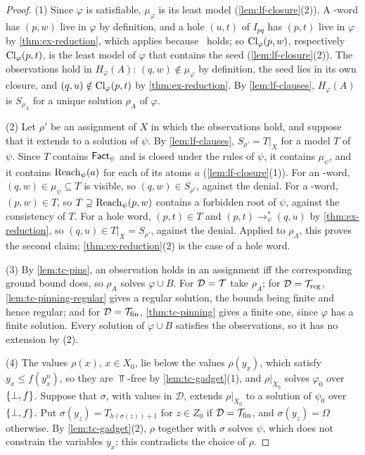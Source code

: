 \begin{proof}
(1) Since $\varphi$ is satisfiable, $\mu_\varphi$ is its least model
(\cref{lem:lf-closure}(2)). A \CondU-word has $(p,w)$ live in $\varphi$ by
definition, and a hole $(u,t)$ of $I_{pq}$ has $(p,t)$ live in $\varphi$ by
\cref{thm:ex-reduction}, which applies because \CondU\ holds; so
$\operatorname{Cl}_\varphi(p,w)$, respectively $\operatorname{Cl}_\varphi(p,t)$, is the least model of
$\varphi$ that contains the seed (\cref{lem:lf-closure}(2)). The observations
hold in $H_\varphi(A)$: $(q,w)\notin\mu_\varphi$ by definition, the seed lies
in its own closure, and $(q,u)\notin\operatorname{Cl}_\varphi(p,t)$ by
\cref{thm:ex-reduction}. By \cref{lem:lf-clauses}, $H_\varphi(A)$ is
$S_{\rho_A}$ for a unique solution $\rho_A$ of $\varphi$.

(2) Let $\rho'$ be an assignment of $X$ in which the observations hold, and
suppose that it extends to a solution of $\psi$. By \cref{lem:lf-clauses},
$S_{\rho'}=T|_X$ for a model $T$ of $\psi$. Since $T$ contains $\mathsf{Fact}_\psi$
and is closed under the rules of $\psi$, it contains $\mu_\psi$, and it
contains $\operatorname{Reach}_\psi(a)$ for each of its atoms $a$ (\cref{lem:lf-closure}(1)).
For an \CondI-word, $(q,w)\in\mu_\psi\subseteq T$ is visible, so
$(q,w)\in S_{\rho'}$, against the denial. For a \CondU-word, $(p,w)\in T$, so
$T\supseteq\operatorname{Reach}_\psi(p,w)$ contains a forbidden root of $\psi$, against the
consistency of $T$. For a hole word, $(p,t)\in T$ and
$(p,t)\to^*_\psi(q,u)$ by \cref{thm:ex-reduction}, so $(q,u)\in T|_X=S_{\rho'}$,
against the denial. Applied to $\rho_A$, this proves the second claim;
\cref{thm:ex-reduction}(2) is the case of a hole word.

(3) By \cref{lem:tc-pins}, an observation holds in an assignment iff the
corresponding ground bound does, so $\rho_A$ solves $\varphi\cup B$. For
$\mathcal D=\mathcal{T}$ take $\rho_A$; for $\mathcal D=\mathcal{T}_{\mathrm{reg}}$,
\cref{lem:tc-pinning-regular} gives a regular solution, the bounds being
finite and hence regular; and for $\mathcal D=\mathcal{T}_{\mathrm{fin}}$,
\cref{thm:tc-pinning} gives a finite one, since $\varphi$ has a finite
solution. Every solution of $\varphi\cup B$ satisfies the observations, so it
has no extension by (2).

(4) The values $\rho(x)$, $x\in X_0$, lie below the values $\rho(y_x)$, which
satisfy $y_x\le f(y_x^n)$, so they are $\Top$-free by \cref{lem:tc-gadget}(1),
and $\rho|_{X_0}$ solves $\varphi_0$ over $\{\bot,f\}$. Suppose that $\sigma$, with
values in $\mathcal D$, extends $\rho|_{X_0}$ to a solution of $\psi_0$ over
$\{\bot,f\}$. Put $\sigma(y_z)=T_{h(\sigma(z))+1}$ for $z\in Z_0$ if
$\mathcal D=\mathcal{T}_{\mathrm{fin}}$, and $\sigma(y_z)=\Omega$ otherwise. By
\cref{lem:tc-gadget}(2), $\rho$ together with $\sigma$ solves $\psi$, which
does not constrain the variables $y_x$; this contradicts the choice of $\rho$.
\end{proof}

